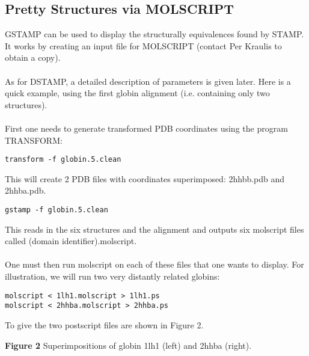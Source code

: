\subsection{Pretty Structures via MOLSCRIPT}

GSTAMP can be used to display the structurally equivalences found by 
STAMP.  It works by creating an input file for MOLSCRIPT \cite{molscript} 
(contact Per Kraulis to obtain a copy).\\
\\
As for DSTAMP, a detailed description of parameters is given later. Here 
is a quick example, using the first globin alignment (i.e. containing only
two structures).\\
\\
First one needs to generate transformed PDB coordinates using the program 
TRANSFORM:

\begin{scriptsize}\begin{verbatim}
transform -f globin.5.clean
\end{verbatim} \end{scriptsize}

This will create 2 PDB files with coordinates superimposed: 2hhbb.pdb and 2hhba.pdb.\\

\begin{scriptsize}\begin{verbatim}
gstamp -f globin.5.clean
\end{verbatim} \end{scriptsize}

This reads in the six structures and the alignment and outputs six
molscript files called (domain identifier).molscript.\\
\\
One must then run molscript on each of these files that one wants to display.  For illustration,
we will run two very distantly related globins:

\begin{scriptsize}\begin{verbatim}
molscript < 1lh1.molscript > 1lh1.ps
molscript < 2hhba.molscript > 2hhba.ps
\end{verbatim} \end{scriptsize}

To give the two postscript files are shown in Figure 2.\\

\vspace*{3.5in}
\noindent
\begin{scriptsize}
{\bf Figure 2} Superimpositions of globin 1lh1 (left) and 2hhba (right).\\
\end{scriptsize}

